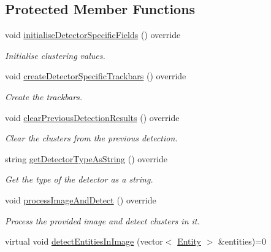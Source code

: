 \subsection*{\-Protected \-Member \-Functions}
\begin{DoxyCompactItemize}
\item 
void \hyperlink{classmultiscale_1_1analysis_1_1ClusterDetector_a67751dd6e21750019a20648b6ba3c8f2}{initialise\-Detector\-Specific\-Fields} () override
\begin{DoxyCompactList}\small\item\em \-Initialise clustering values. \end{DoxyCompactList}\item 
void \hyperlink{classmultiscale_1_1analysis_1_1ClusterDetector_a7877cc5364f576e6a9cd96a6cd528cfc}{create\-Detector\-Specific\-Trackbars} () override
\begin{DoxyCompactList}\small\item\em \-Create the trackbars. \end{DoxyCompactList}\item 
void \hyperlink{classmultiscale_1_1analysis_1_1ClusterDetector_a5679e30f1ea35203963bf2baa8d7ed36}{clear\-Previous\-Detection\-Results} () override
\begin{DoxyCompactList}\small\item\em \-Clear the clusters from the previous detection. \end{DoxyCompactList}\item 
string \hyperlink{classmultiscale_1_1analysis_1_1ClusterDetector_aa6adbee2ccb7b0b66fb5242635e78d08}{get\-Detector\-Type\-As\-String} () override
\begin{DoxyCompactList}\small\item\em \-Get the type of the detector as a string. \end{DoxyCompactList}\item 
void \hyperlink{classmultiscale_1_1analysis_1_1ClusterDetector_a736847233c57cfa59abb953f70ef9209}{process\-Image\-And\-Detect} () override
\begin{DoxyCompactList}\small\item\em \-Process the provided image and detect clusters in it. \end{DoxyCompactList}\item 
virtual void \hyperlink{classmultiscale_1_1analysis_1_1ClusterDetector_a115f47c1f0855886ef5ca48acc111843}{detect\-Entities\-In\-Image} (vector$<$ \hyperlink{classmultiscale_1_1analysis_1_1Entity}{\-Entity} $>$ \&entities)=0

\end{DoxyCompactItemize}
